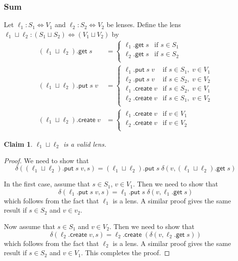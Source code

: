 \documentclass[acmsmall,review,anonymous]{acmart}\settopmatter{printfolios=true,printccs=false,printacmref=false}
\newtheorem{claim}{Claim}
\newcommand{\kw}[1]{\ensuremath{\mathsf{#1}}}
\newcommand{\get}{\ensuremath{\kw{get}}}
\newcommand{\pput}{\ensuremath{\kw{put}}}
\newcommand{\create}{\ensuremath{\kw{create}}}
\begin{document}
\subsubsection{Sum}
Let $\ell_1 : S_1 \Leftrightarrow V_1$ and $\ell_2 : S_2 \Leftrightarrow V_2$ be
lenses. Define the lens $\ell_1 \sqcup \ell_2 : (S_1 \sqcup S_2) \Leftrightarrow
(V_1 \sqcup V_2)$ by
\begin{align*}
(\ell_1 \sqcup \ell_2).\get \; s &= 
\begin{cases}
\ell_1.\get \; s & \text{if } s \in S_1\\
\ell_2.\get \; s & \text{if } s \in S_2\\
\end{cases}\\
(\ell_1 \sqcup \ell_2).\pput \; s \; v&= 
\begin{cases}
\ell_1.\pput \; s \; v& \text{if } s \in S_1, \; v \in V_1\\
\ell_2.\pput \; s \; v& \text{if } s \in S_2, \; v \in V_2\\
\ell_1.\create \; v & \text{if } s \in S_2, \; v \in V_1\\
\ell_2.\create \; v & \text{if } s \in S_1, \; v \in V_2\\
\end{cases}\\
(\ell_1 \sqcup \ell_2).\create \; v &= 
\begin{cases}
\ell_1.\create \; v & \text{if } v \in V_1\\
\ell_2.\create \; v & \text{if } v \in V_2\\
\end{cases}
\end{align*}
\begin{claim}
$\ell_1 \sqcup \ell_2$ is a valid lens.
\end{claim}
\begin{proof}
We need to show that
$$\delta((\ell_1 \sqcup \ell_2).\pput \; s \; v, s) = (\ell_1 \sqcup
\ell_2).\pput \; s \; \delta(v, (\ell_1 \sqcup \ell_2).\get \; s)$$

In the first case, assume that $s \in S_1$, $v \in V_1$. Then we need to show
that $$\delta(\ell_1.\pput \; s \; v, s) = \ell_1.\pput \; s \; \delta(v,
\ell_1.\get \; s)$$
which follows from the fact that $\ell_1$ is a lens. A similar proof gives the
same result if $s \in S_2$ and $v \in v_2$.

Now assume that $s \in S_1$ and $v \in V_2$. Then we need to show
that 
$$\delta(\ell_2.\create \; v, s) = \ell_2.\create \; (\delta(v, \ell_2.\get \;
s))$$ which follows from the fact that $\ell_2$ is a lens. A similar proof gives
the same result if $s \in S_2$ and $v \in V_1$. This completes the proof.
\end{proof}
\end{document}
